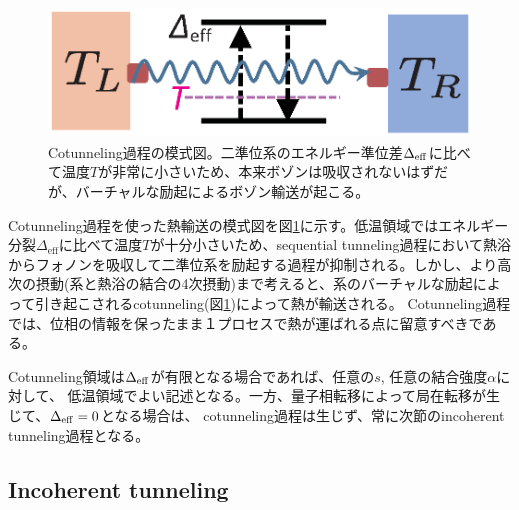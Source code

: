 \begin{figure}[tb]
	\centering
	\includegraphics[height=3.5cm]{cotunneling.eps}
	\caption{Cotunneling過程の模式図。二準位系のエネルギー準位差$\Delta_{\rm{eff}}$に比べて温度$T$が非常に小さいため、本来ボゾンは吸収されないはずだが、バーチャルな励起によるボゾン輸送が起こる。}
	\label{fig:cotunneling}
\end{figure}

Cotunneling過程を使った熱輸送の模式図を図\ref{fig:cotunneling}に示す。低温領域ではエネルギー分裂$\Delta_{\mathrm{eff}}$に比べて温度$T$が十分小さいため、sequential tunneling過程において熱浴からフォノンを吸収して二準位系を励起する過程が抑制される。しかし、より高次の摂動(系と熱浴の結合の4次摂動)まで考えると、系のバーチャルな励起によって引き起こされるcotunneling(図\ref{fig:cotunneling})によって熱が輸送される。
Cotunneling過程では、位相の情報を保ったまま１プロセスで熱が運ばれる点に留意すべきである。

Cotunneling領域は$\Delta_{\rm eff}$が有限となる場合であれば、任意の$s$, 任意の結合強度$\alpha$に対して、
低温領域でよい記述となる。一方、量子相転移によって局在転移が生じて、$\Delta_{\rm eff}=0$となる場合は、
cotunneling過程は生じず、常に次節のincoherent tunneling過程となる。

\subsection{Incoherent  tunneling}

